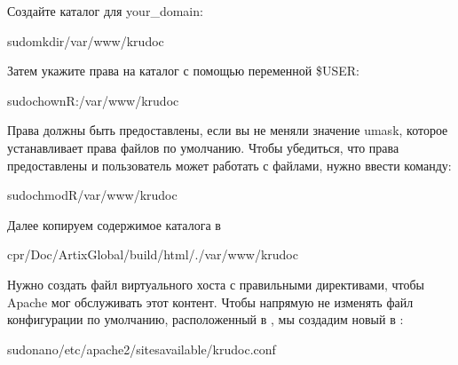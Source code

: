 \documentclass[a4paper,10pt,russian]{report}
\begin{document}
\sphinxAtStartPar
Создайте каталог для your\_domain:

\begin{sphinxVerbatim}[commandchars=\\\{\}]
\PYGZdl{}sudomkdir/var/www/krudoc
\end{sphinxVerbatim}

\sphinxAtStartPar
Затем укажите права на каталог с помощью переменной \$USER:

\begin{sphinxVerbatim}[commandchars=\\\{\}]
\PYGZdl{}sudochown\PYGZhy{}R:/var/www/krudoc
\end{sphinxVerbatim}

\sphinxAtStartPar
Права должны быть предоставлены, если вы не меняли значение umask, которое устанавливает права файлов по умолчанию. Чтобы убедиться,
что права предоставлены и пользователь может работать с файлами, нужно ввести команду:

\begin{sphinxVerbatim}[commandchars=\\\{\}]
\PYGZdl{}sudochmod\PYGZhy{}R/var/www/krudoc
\end{sphinxVerbatim}

\sphinxAtStartPar
Далее копируем содержимое каталога   в  

\begin{sphinxVerbatim}[commandchars=\\\{\}]
\PYGZdl{}cp\PYGZhy{}r\PYGZti{}/Doc/Artix\PYGZus{}Global/build/html/./var/www/krudoc
\end{sphinxVerbatim}

\sphinxAtStartPar
Нужно создать файл виртуального хоста с правильными директивами, чтобы Apache мог обслуживать этот контент.
Чтобы напрямую не изменять файл конфигурации по умолчанию, расположенный
в , мы создадим новый в :

\begin{sphinxVerbatim}[commandchars=\\\{\}]
\PYGZdl{}sudonano/etc/apache2/sites\PYGZhy{}available/krudoc.conf
\end{sphinxVerbatim}
\end{document}
